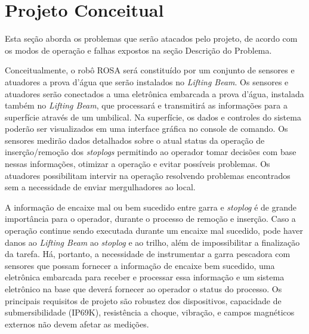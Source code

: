 

\section{Projeto Conceitual}
Esta seção aborda os problemas que serão atacados pelo projeto, de acordo com os
modos de operação e falhas expostos na seção Descrição do Problema.

Conceitualmente, o robô ROSA será constituído por um conjunto de sensores e
atuadores a prova d'água que serão instalados no \emph{Lifting Beam}. Os
sensores e atuadores serão conectados a uma eletrônica embarcada a prova d'água,
instalada também no \emph{Lifting Beam}, que processará e transmitirá as
informações para a superfície através de um umbilical. Na superfície, os dados e
controles do sistema poderão ser visualizados em uma interface gráfica no
console de comando. Os sensores medirão dados detalhados sobre o atual status da
operação de inserção/remoção dos \emph{stoplogs} permitindo ao operador tomar decisões
com base nessas informações, otimizar a operação e evitar possíveis problemas.
Os atuadores possibilitam intervir na operação resolvendo problemas encontrados
sem a necessidade de enviar mergulhadores ao local.

A informação de encaixe mal ou bem sucedido entre garra e \emph{stoplog} é de grande
importância para o operador, durante o processo de remoção e inserção. Caso a
operação continue sendo executada durante um encaixe mal sucedido, pode haver
danos ao  \emph{Lifting Beam} ao \emph{stoplog} e ao trilho, além de impossibilitar a
finalização da tarefa. Há, portanto, a necessidade de instrumentar a garra
pescadora com sensores que possam fornecer a informação de encaixe bem sucedido,
uma eletrônica embarcada para receber e processar essa informação e um sistema
eletrônico na base que deverá fornecer ao operador o status do processo.
Os principais requisitos de projeto são robustez dos dispositivos, capacidade de
submersibilidade (IP69K), resistência a choque, vibração, e campos magnéticos
externos não devem afetar as medições.


